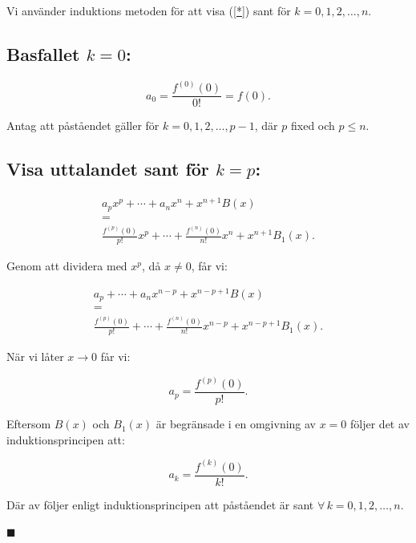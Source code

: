 \documentclass{article}
\begin{document}
\noindent Vi använder induktions metoden för att visa
(\ref{*}) sant för $k=0,1,2,\ldots,n$.

\subsection*{Basfallet $k=0$:}

\begin{equation}
    a_0 = \frac{f^{(0)}(0)}{0!} = f(0).
\end{equation}

\noindent Antag att påståendet gäller för
$k=0,1,2,\ldots,p-1$, där $p$ fixed och $p\leq n$.

\subsection*{Visa uttalandet sant för $k=p$:}

\begin{equation}
\begin{gathered}
    a_px^p + \cdots + a_nx^n + x^{n+1}B(x)\\
    =\\
    \frac{f^{(p)}(0)}{p!}x^p
    + \cdots
    + \frac{f^{(n)}(0)}{n!}x^n
    + x^{n+1}B_1(x).
\end{gathered}
\end{equation}

\noindent Genom att dividera med $x^p$, då $x\neq 0$, får vi:

\begin{equation}
\begin{gathered}
    a_p + \cdots + a_nx^{n-p}
    + x^{n-p+1}B(x)\\
    =\\
    \frac{f^{(p)}(0)}{p!}
    + \cdots
    + \frac{f^{(n)}(0)}{n!}x^{n-p}
    + x^{n-p+1}B_1(x).
\end{gathered}
\end{equation}

\noindent När vi låter $x\longrightarrow 0$ får vi:

\begin{equation}
    a_p = \frac{f^{(p)}(0)}{p!}.
\end{equation}

\noindent Eftersom $B(x)$ och $B_1(x)$ är begränsade i en
omgivning av $x=0$ följer det av induktionsprincipen att:

\begin{equation}
    a_k = \frac{f^{(k)}(0)}{k!}.
\end{equation}

\noindent Där av följer enligt induktionsprincipen att
påståendet är sant $\forall\, k=0,1,2,\ldots,n$.
\begin{flushright}
    $\blacksquare$
\end{flushright}
\end{document}
